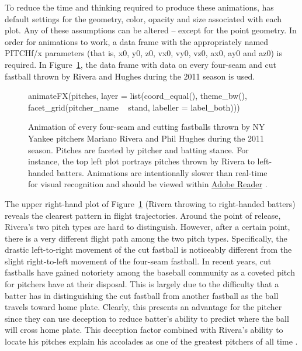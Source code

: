 \begin{article}
To reduce the time and thinking required to produce these animations,
 has default settings for the geometry, color, opacity
and size associated with each plot. Any of these assumptions can be
altered -- except for the point geometry. In order for animations to
work, a data frame with the appropriately named PITCHf/x parameters
(that is, x0, y0, z0, vx0, vy0, vz0, ax0, ay0 and az0) is required.
In Figure~\ref{fig:animate1}, the data frame  with
data on every four-seam and cut fastball thrown by Rivera and Hughes
during the 2011 season is used.

\begin{figure}[h!]
\begin{Schunk}
\begin{Sinput}
animateFX(pitches, layer = list(coord_equal(), theme_bw(),
  facet_grid(pitcher_name ~ stand, labeller = label_both)))
\end{Sinput}
\end{Schunk}
\caption{\label{fig:animate1}Animation of every four-seam and cutting
  fastballs thrown by NY Yankee pitchers Mariano Rivera and Phil
  Hughes during the 2011 season. Pitches are faceted by pitcher and
  batting stance.  For instance, the top left plot portrays pitches
  thrown by Rivera to left-handed batters. Animations are
  intentionally slower than real-time for visual recognition and
  should be viewed within
  \protect\href{http://get.adobe.com/reader/}{Adobe Reader}
  \citep{knitr}.}
\end{figure}

The upper right-hand plot of Figure~\ref{fig:animate1} (Rivera throwing
to right-handed batters) reveals the clearest pattern in flight trajectories.
Around the point of release, Rivera's two pitch types are hard to
distinguish. However, after a certain point, there is a very different
flight path among the two pitch types. Specifically, the drastic left-to-right
movement of the cut fastball is noticeably different from the slight
right-to-left movement of the four-seam fastball. In recent years,
cut fastballs have gained notoriety among the baseball community as
a coveted pitch for pitchers have at their disposal. This is largely
due to the difficulty that a batter has in distinguishing the cut
fastball from another fastball as the ball travels toward home plate.
Clearly, this presents an advantage for the pitcher since they can
use deception to reduce batter's ability to predict where the ball
will cross home plate. This deception factor combined with Rivera's
ability to locate his pitches explain his accolades as one of the
greatest pitchers of all time \citep{NYT}.


\end{article}
